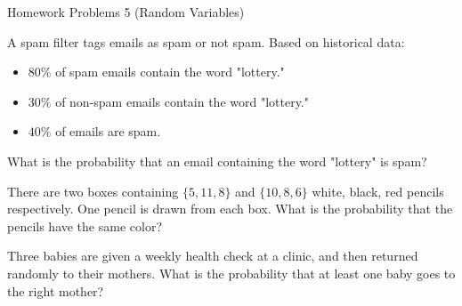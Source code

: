 \begin{center}\begin{large} Homework Problems 5 (Random Variables) \end{large}\end{center}
 \bigskip




\begin{problem}
        A spam filter tags emails as spam or not spam. Based on historical data:
    \begin{itemize}
        \item $80\%$ of spam emails contain the word "lottery."
        \item $30\%$ of non-spam emails contain the word "lottery."
        \item $40\%$ of emails are spam.
    \end{itemize}
    
    What is the probability that an email  containing the word "lottery" is spam?
\end{problem}
% 


\medskip



\begin{problem}
There are two boxes containing $\{5, 11, 8\}$ and $\{10, 8, 6\}$ white, black, red pencils respectively. One pencil is drawn from each box. What is the probability that the pencils have the same color?

\end{problem}
\medskip


\begin{problem}
    Three babies are given a weekly health check at a clinic, and then returned randomly to their mothers. What is the probability that at least one baby goes to the right mother?
\end{problem}

\medskip


